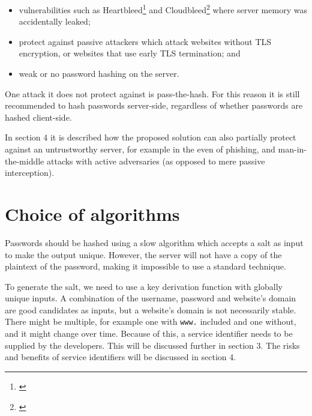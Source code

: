 \documentclass{paper}
\newcommand{\code}[1]{\texttt{\colorbox{gray!11}{#1}}}
\begin{document}
\begin{itemize}
\item vulnerabilities such as
Heartbleed\footnote{\href{https://en.wikipedia.org/wiki/Heartbleed}{\underline{}}}
and Cloudbleed\footnote{{\href{https://en.wikipedia.org/wiki/Cloudbleed}{\underline{}}}} where server memory was accidentally leaked;

\item protect against passive attackers which attack websites without TLS encryption, or
websites that use early TLS termination\footnotemark; and

\item weak or no password hashing on the server.
\end{itemize}


One attack it does not protect against is pass-the-hash. For this reason it is still
recommended to hash passwords server-side, regardless of whether passwords are hashed
client-side.

In section 4 it is described how the proposed solution can also partially protect against an
untrustworthy server, for example in the even of phishing, and man-in-the-middle attacks with
active adversaries (as opposed to mere passive interception).

\section{Choice of algorithms}

Passwords should be hashed using a slow algorithm which accepts a salt as input to make the
output unique. However, the server will not have a copy of the plaintext of the password,
making it impossible to use a standard technique.

To generate the salt, we need to use a key derivation function with globally unique inputs.
A combination of the username, password and website's domain are good candidates as inputs,
but a website's domain is not necessarily stable. There might be multiple, for example one
with \code{www.} included and one without, and it might change over time. Because of this, a
service identifier needs to be supplied by the developers. This will be discussed further in
section 3. The risks and benefits of service identifiers will be discussed in section 4.
\end{document}

